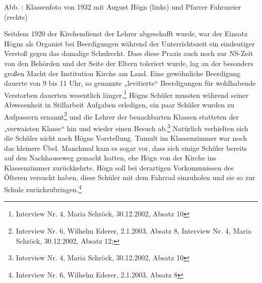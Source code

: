 \documentclass[a4paper]{article}
\newcounter{Abb}
\renewcommand\theAbb{\arabic{Abb}}
\begin{document}
{%
 \par}
Abb. \stepcounter{Abb}{\theAbb}: Klassenfoto von 1932 mit August Högn
(links) und Pfarrer Fahrmeier (rechts)

Seitdem 1920 der Kirchendienst der Lehrer abgeschafft wurde, war der
Einsatz Högns als Organist bei Beerdigungen während der Unterrichtszeit
ein eindeutiger Verstoß gegen das damalige Schulrecht. Dass diese
Praxis auch noch zur NS-Zeit von den Behörden und der Seite der Eltern
toleriert wurde, lag an der besonders großen Macht der Institution
Kirche am Land. Eine gewöhnliche Beerdigung dauerte von 9 bis 11 Uhr,
so genannte „levitierte“ Beerdigungen für wohlhabende Verstorben
dauerten wesentlich länger.\footnote{ Interview Nr. 4, Maria Schröck,
30.12.2002, Absatz 10} Högns Schüler mussten während seiner Abwesenheit
in Stillarbeit Aufgaben erledigen, ein paar Schüler wurden zu
Aufpassern ernannt\footnote{ Interview Nr. 6, Wilhelm Ederer, 2.1.2003,
Absatz 8, Interview Nr. 4, Maria Schröck, 30.12.2002, Absatz 12;} und
die Lehrer der benachbarten Klassen statteten der „verwaisten Klasse“
hin und wieder einen Besuch ab.\footnote{ Interview Nr. 4, Maria
Schröck, 30.12.2002, Absatz 10} Natürlich verhielten sich die Schüler
nicht nach Högns Vorstellung. Tumult im Klassenzimmer war noch das
kleinere Übel. Manchmal kam es sogar vor, dass sich einige Schüler
bereits auf den Nachhauseweg gemacht hatten, ehe Högn von der Kirche
ins Klassenzimmer zurückkehrte. Högn soll bei derartigen Vorkommnissen
des Öfteren versucht haben, diese Schüler mit dem Fahrrad einzuholen
und sie so zur Schule zurückzubringen.\footnote{ Interview Nr. 6,
Wilhelm Ederer, 2.1.2003, Absatz 8}
\end{document}
